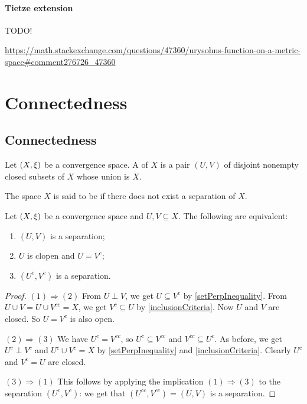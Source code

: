 \subsubsection{Tietze extension}
TODO!

\url{https://math.stackexchange.com/questions/47360/urysohns-function-on-a-metric-space#comment276726_47360}

\chapter{Connectedness}
\section{Connectedness}
\begin{definition}
Let $\left( X, \xi \right)$ be a convergence space. A  of $X$ is a pair $(U,V)$ of disjoint nonempty closed subsets of $X$ whose union is $X$.

The space $X$ is said to be  if there does not exist a separation of $X$.
\end{definition}

\begin{lemma} \label{disconnectionLemma}
Let $\left( X, \xi \right)$ be a convergence space and $U,V\subseteq X$. The following are equivalent:
\begin{enumerate}
\item $(U, V)$ is a separation;
\item $U$ is clopen and $U= V^c$;
\item $(U^c, V^c)$ is a separation.
\end{enumerate}
\end{lemma}
\begin{proof}
$(1) \Rightarrow (2)$ From $U\perp V$, we get $U\subseteq V^c$ by \ref{setPerpInequality}. From $U\cup V = U\cup V^{cc} = X$, we get $V^c \subseteq U$ by \ref{inclusionCriteria}. Now $U$ and $V$ are closed. So $U = V^c$ is also open.

$(2) \Rightarrow (3)$ We have $U^c = V^{cc}$, so $U^c \subseteq V^{cc}$ and $V^{cc}\subseteq U^c$. As before, we get $U^c\perp V^c$ and $U^c \cup V^c = X$ by \ref{setPerpInequality} and \ref{inclusionCriteria}. Clearly $U^c$ and $V^c = U$ are closed.

$(3) \Rightarrow (1)$ This follows by applying the implication $(1) \Rightarrow (3)$ to the separation $(U^c, V^c)$: we get that $(U^{cc}, V^{cc}) = (U,V)$ is a separation.
\end{proof}

